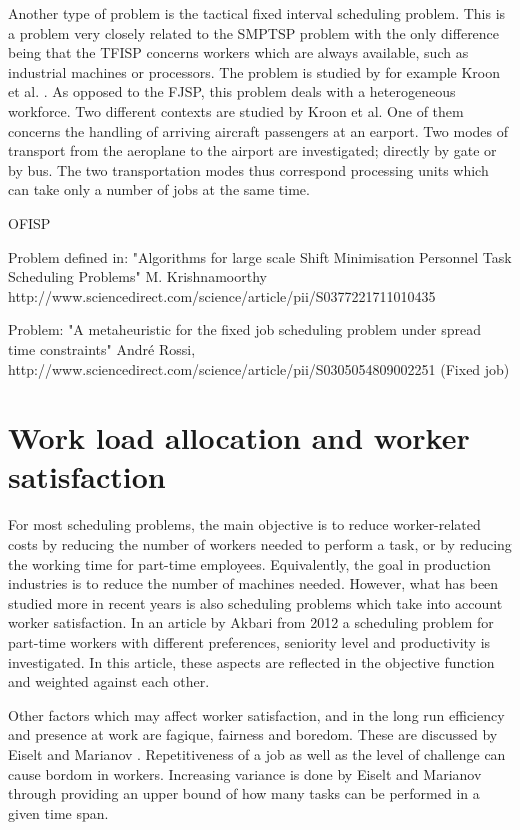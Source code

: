 Another type of problem is the tactical fixed interval scheduling problem. This is a problem very closely related to the SMPTSP problem with the only difference being that the TFISP concerns workers which are always available, such as industrial machines or processors. The problem is studied by for example Kroon et al. \cite{kroon_1997}. As opposed to the FJSP, this problem deals with a heterogeneous workforce. Two different contexts are studied by Kroon et al. One of them concerns the handling of arriving aircraft passengers at an earport. Two modes of transport from the aeroplane to the airport are investigated; directly by gate or by bus. The two transportation modes thus correspond processing units which can take only a number of jobs at the same time.

OFISP



Problem defined in: "Algorithms for large scale Shift Minimisation Personnel Task Scheduling Problems" M. Krishnamoorthy
http://www.sciencedirect.com/science/article/pii/S0377221711010435

Problem: "A metaheuristic for the fixed job scheduling problem under spread time constraints" André Rossi, http://www.sciencedirect.com/science/article/pii/S0305054809002251 (Fixed job)

\section{Work load allocation and worker satisfaction} \label{WLA}
For most scheduling problems, the main objective is to reduce worker-related costs by reducing the number of workers needed to perform a task, or by reducing the working time for part-time employees. Equivalently, the goal in production industries is to reduce the number of machines needed. However, what has been studied more in recent years is also scheduling problems which take into account worker satisfaction. In an article by Akbari from 2012 a scheduling problem for part-time workers with different preferences, seniority level and productivity is investigated. In this article, these aspects are reflected in the objective function and weighted against each other. \cite{akbari_2012}

Other factors which may affect worker satisfaction, and in the long run efficiency and presence at work are fagique, fairness and boredom. These are discussed by Eiselt and Marianov \cite{eiselt_2006}. Repetitiveness of a job as well as the level of challenge can cause bordom in workers. Increasing variance is done by Eiselt and Marianov through providing an upper bound of how many tasks can be performed in a given time span. 

